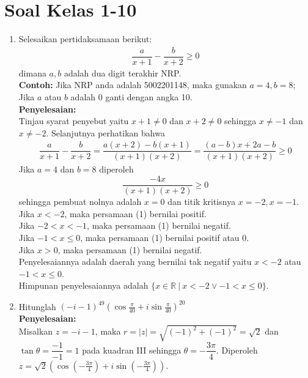 \documentclass{article}
\begin{document}
\section*{Soal Kelas 1-10}
\begin{enumerate}
    \item Selesaikan pertidaksamaan berikut:
    \begin{align*}
    \dfrac{a}{x+1}-\dfrac{b}{x+2}\geq 0
    \end{align*}
    dimana $a,b$ adalah dua digit terakhir NRP.\\
    \textbf{Contoh:} Jika NRP anda adalah 5002201148, maka gunakan $a=4,b=8$; Jika $a$ atau $b$ adalah 0 ganti dengan angka 10.\\
    \textbf{Penyelesaian:}\\
    Tinjau syarat penyebut yaitu $x+1\neq 0$ dan $x+2\neq 0$ sehingga $x\neq -1$ dan $x\neq -2$. Selanjutnya perhatikan bahwa
    \begin{align*}
    \dfrac{a}{x+1}-\dfrac{b}{x+2} = \dfrac{a(x+2)-b(x+1)}{(x+1)(x+2)} = \dfrac{(a-b)x+2a-b}{(x+1)(x+2)} \geq 0 
    \end{align*}
    Jika $a=4$ dan $b=8$ diperoleh 
    \begin{equation}
    \dfrac{-4x}{(x+1)(x+2)}\geq 0
    \end{equation}
    sehingga pembuat nolnya adalah $x=0$ dan titik kritisnya $x=-2,x=-1$. \\
    Jika $x<-2$, maka persamaan (1) bernilai positif. \\
    Jika $-2<x<-1$, maka persamaan (1) bernilai negatif.\\
    Jika $-1<x\leq 0$, maka persamaan (1) bernilai positif atau 0.\\
    Jika $x>0$, maka persamaan (1) bernilai negatif.\\
    Penyelesaiannya adalah daerah yang bernilai tak negatif yaitu $x<-2$ atau $-1<x\leq 0$.\\
    Himpunan penyelesaiannya adalah $\{x\in \mathbb{R}~|~ x<-2 \vee -1<x\leq 0\}$.
    \item Hitunglah $(-i-1)^{49}(\cos \frac{\pi}{40}+i\sin\frac{\pi}{40})^{20}$\\
    \textbf{Penyelesaian:}\\
    Misalkan $z=-i-1$, maka $r=|z|=\sqrt{(-1)^2+(-1)^2}=\sqrt{2}$ dan $\tan \theta = \dfrac{-1}{-1}=1$ pada kuadran III sehingga $\theta=-\dfrac{3\pi}{4}$. Diperoleh $z=\sqrt{2}\left(\cos (-\frac{3\pi}{4})+i\sin(-\frac{3\pi}{4})\right)$. \\

\end{enumerate}
\end{document}
